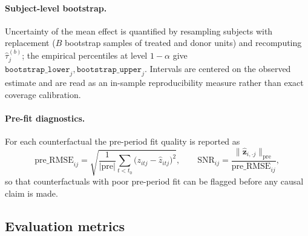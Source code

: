 \documentclass[11pt]{article}
\begin{document}
\paragraph{Subject-level bootstrap.}
Uncertainty of the mean effect is quantified by resampling subjects with replacement
($B$ bootstrap samples of treated and donor units) and recomputing
$\hat\tau^{(b)}_{j}$; the empirical percentiles at level $1-\alpha$ give
$\texttt{bootstrap\_lower}_j,\texttt{bootstrap\_upper}_j$. Intervals are centered on the observed
estimate and are read as an in-sample reproducibility measure rather than exact coverage
calibration.

\paragraph{Pre-fit diagnostics.}
For each counterfactual the pre-period fit quality is reported as
\begin{equation}\label{eq:prefit}
\mathrm{pre\_RMSE}_{ij} = \sqrt{\frac{1}{|\mathrm{pre}|}\sum_{t<t_0}
\big(z_{itj}-\hat z_{itj}\big)^2},
\qquad
\mathrm{SNR}_{ij} = \frac{\|\hat{\mathbf z}_{i,\cdot j}\|_{\mathrm{pre}}}{\mathrm{pre\_RMSE}_{ij}},
\end{equation}
so that counterfactuals with poor pre-period fit can be flagged before any causal claim is made.

\subsection{Evaluation metrics}\label{sec:metrics}
\end{document}
